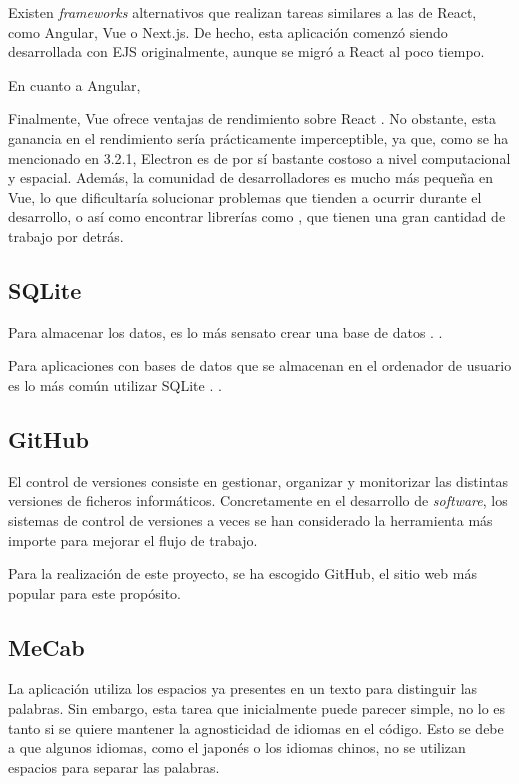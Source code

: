 Existen \textit{frameworks} alternativos que realizan tareas similares a las de React, como Angular, Vue o Next.js. De hecho, esta aplicación comenzó siendo desarrollada con EJS originalmente, aunque se migró a React al poco tiempo.

En cuanto a Angular,

Finalmente, Vue ofrece ventajas de rendimiento sobre React \autocite{Comparison}. No obstante, esta ganancia en el rendimiento sería prácticamente imperceptible, ya que, como se ha mencionado en 3.2.1, Electron es de por sí bastante costoso a nivel computacional y espacial. Además, la comunidad de desarrolladores es mucho más pequeña en Vue, lo que dificultaría solucionar problemas que tienden a ocurrir durante el desarrollo, o así como encontrar librerías como , que tienen una gran cantidad de trabajo por detrás.

\subsection{SQLite}

Para almacenar los datos, es lo más sensato crear una base de datos \citationNeeded. .

Para aplicaciones con bases de datos que se almacenan en el ordenador de usuario es lo más común utilizar SQLite \citationNeeded. .

\subsection{GitHub}

El control de versiones consiste en gestionar, organizar y monitorizar las distintas versiones de ficheros informáticos. Concretamente en el desarrollo de \textit{software}, los sistemas de control de versiones a veces se han considerado la herramienta más importe para mejorar el flujo de trabajo. \autocite{1504674}

Para la realización de este proyecto, se ha escogido GitHub, el sitio web más popular para este propósito.

\subsection{MeCab}

La aplicación utiliza los espacios ya presentes en un texto para distinguir las palabras. Sin embargo, esta tarea que inicialmente puede parecer simple, no lo es tanto si se quiere mantener la agnosticidad de idiomas en el código. Esto se debe a que algunos idiomas, como el japonés o los idiomas chinos, no se utilizan espacios para separar las palabras.

